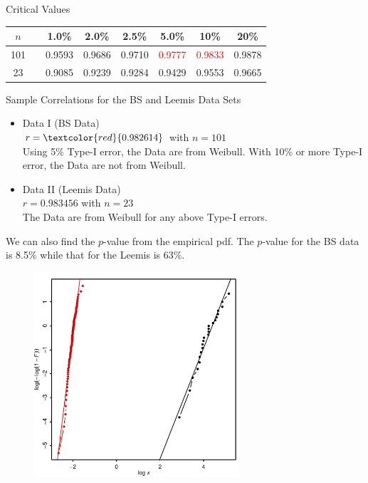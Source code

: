 \begin{frame}   %
\begin{block}{Critical Values}
\begin{tabular}{cccccccc}
\hline
$n$ & &1.0\%  &2.0\%  &2.5\%  &5.0\%  &10\%   &20\%  \\
\hline
101 & &0.9593 &0.9686 &0.9710 &\textcolor{red}{0.9777} & \textcolor{red}{0.9833} &0.9878 \\
 23 & &0.9085 &0.9239 &0.9284 &0.9429 &0.9553 &0.9665 \\
\hline
\end{tabular}
\end{block}

\begin{block}{Sample Correlations for the BS and Leemis Data Sets}
\begin{itemize}
\item Data I (BS Data) \\
$r = \textcolor{red}{0.982614}$ with $n=101$ \\
Using 5\% Type-I error, the Data are from Weibull.
With 10\% or more Type-I error, the Data are not from Weibull.
\item Data II (Leemis Data) \\
$r = 0.983456$ with $n=23$ \\
The Data are from Weibull for any above Type-I errors.
\end{itemize}
\end{block}
We can also find the $p$-value from the empirical pdf.
The $p$-value for the BS data is 8.5\% while that for the Leemis is 63\%.
\end{frame}


\begin{frame}   %
\begin{figure}[h]
   \includegraphics[width=3.0in]{Weibull4.pdf} %
   \vspace{-3ex}
\end{figure}
\end{frame}


